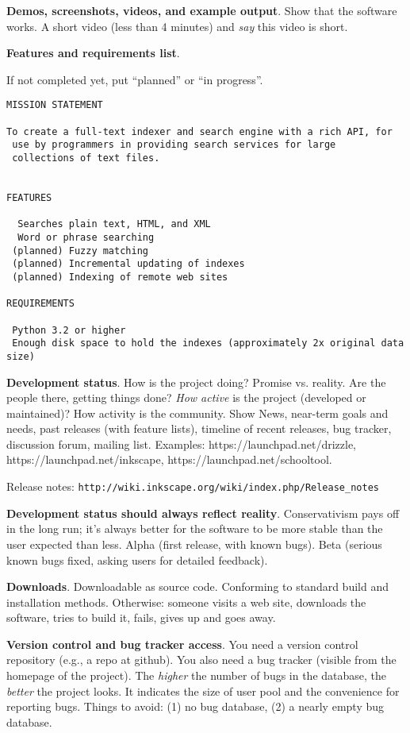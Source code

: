 \documentclass[landscape,30pt]{foils}
\begin{document}
{\bf Demos, screenshots, videos, and example output}.  Show that the software works.  A short video (less than 4 minutes) and {\em say} this video is short.

{\bf Features and requirements list}.

If not completed yet, put ``planned'' or ``in progress''.
{\tiny
\begin{verbatim}
MISSION STATEMENT

To create a full-text indexer and search engine with a rich API, for
 use by programmers in providing search services for large
 collections of text files.


FEATURES

  Searches plain text, HTML, and XML
  Word or phrase searching
 (planned) Fuzzy matching
 (planned) Incremental updating of indexes
 (planned) Indexing of remote web sites

REQUIREMENTS

 Python 3.2 or higher
 Enough disk space to hold the indexes (approximately 2x original data size)

\end{verbatim}
}

{\bf Development status}.  How is the project doing?  Promise vs. reality.  Are the people there, getting things done? {\em How active} is the project (developed or maintained)?  How activity is the community.  Show News, near-term goals and needs, past releases (with feature lists), timeline of recent releases, bug tracker, discussion forum, mailing list. Examples: https://launchpad.net/drizzle, https://launchpad.net/inkscape, https://launchpad.net/schooltool.

Release notes:  \texttt{http://wiki.inkscape.org/wiki/index.php/Release\_notes}


{\bf Development status should always reflect reality}.
Conservativism pays off in the long run; it's always better for the
software to be more stable than the user expected than less.  Alpha (first release, with known bugs).  Beta (serious known bugs fixed, asking users for detailed feedback).

{\bf Downloads}.  Downloadable as source code.   Conforming to standard build and installation methods.
Otherwise: someone visits a web site, downloads the software, tries to build it, fails, gives up and goes away.

{\bf Version control and bug tracker access}. You need a version control repository (e.g., a repo at github).  You also need a bug tracker (visible from the homepage of the project).  The {\em higher} the number of bugs in the database, the {\em better} the project looks.  It indicates the size of user pool and the convenience for reporting bugs.  Things to avoid: (1) no bug database, (2) a nearly empty bug database.
\end{document}

